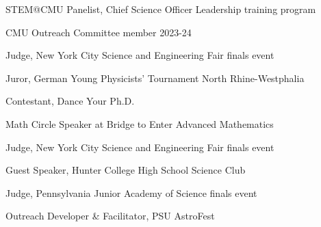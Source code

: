 \documentclass[11pt,letterpaper]{article}
\begin{document}
\begin{list}{}{\malzlist}
	\item STEM@CMU Panelist, Chief Science Officer Leadership training program 
	\item CMU Outreach Committee member 2023-24
	\item Judge, New York City Science and Engineering Fair finals event %
	\item Juror, German Young Physicists' Tournament North Rhine-Westphalia %
	\item Contestant, Dance Your Ph.D.  %
	\begin{list}{}{\malzlist}
		\item {}
	\end{list}
	\item Math Circle Speaker at Bridge to Enter Advanced Mathematics %
	\begin{list}{}{\malzlist}
		\item {}%
	\end{list}
	\item Judge, New York City Science and Engineering Fair finals event %
	\item Guest Speaker, Hunter College High School Science Club %
	\item Judge, Pennsylvania Junior Academy of Science finals event %
	\item Outreach Developer \& Facilitator, PSU AstroFest 
	\begin{list}{}{\malzlist}
		\item {}%
	\end{list}
\end{list}
\end{document}
